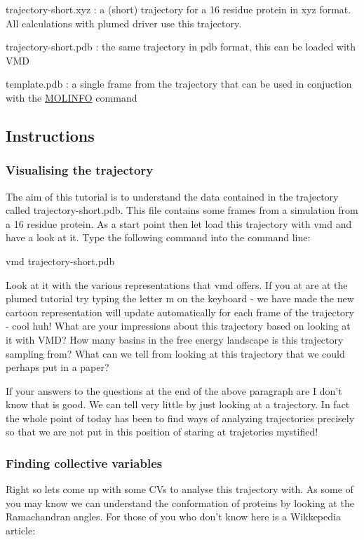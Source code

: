 \begin{DoxyItemize}
\item trajectory-\/short.\+xyz \+: a (short) trajectory for a 16 residue protein in xyz format. All calculations with plumed driver use this trajectory.
\item trajectory-\/short.\+pdb \+: the same trajectory in pdb format, this can be loaded with V\+M\+D
\item template.\+pdb \+: a single frame from the trajectory that can be used in conjuction with the \hyperlink{MOLINFO}{M\+O\+L\+I\+N\+F\+O} command
\end{DoxyItemize}\hypertarget{belfast-10_Instructions}{}\subsection{Instructions}\label{belfast-10_Instructions}
\hypertarget{belfast-3_vis-traj}{}\subsubsection{Visualising the trajectory}\label{belfast-3_vis-traj}
The aim of this tutorial is to understand the data contained in the trajectory called trajectory-\/short.\+pdb. This file contains some frames from a simulation from a 16 residue protein. As a start point then let load this trajectory with vmd and have a look at it. Type the following command into the command line\+:

\begin{DoxyVerb}vmd trajectory-short.pdb
\end{DoxyVerb}


Look at it with the various representations that vmd offers. If you at are at the plumed tutorial try typing the letter m on the keyboard -\/ we have made the new cartoon representation will update automatically for each frame of the trajectory -\/ cool huh! What are your impressions about this trajectory based on looking at it with V\+M\+D? How many basins in the free energy landscape is this trajectory sampling from? What can we tell from looking at this trajectory that we could perhaps put in a paper?

If your answers to the questions at the end of the above paragraph are I don't know that is good. We can tell very little by just looking at a trajectory. In fact the whole point of today has been to find ways of analyzing trajectories precisely so that we are not put in this position of staring at trajetories mystified!\hypertarget{belfast-10_cvs}{}\subsubsection{Finding collective variables}\label{belfast-10_cvs}
Right so lets come up with some C\+Vs to analyse this trajectory with. As some of you may know we can understand the conformation of proteins by looking at the Ramachandran angles. For those of you who don't know here is a Wikkepedia article\+:

